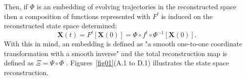 \documentclass[fleqn,10pt]{wlscirep}
\begin{document}
Then, if $\Phi$ is an embedding of evolving trajectories in the reconstructed 
space then a composition of functions represented with $F^t$ is induced on the
reconstructed state space determined:
\begin{equation}\label{eq:st}
  \boldsymbol{X}(t)=F^t [\boldsymbol{X}(0)] = \Phi \circ f^t \circ \Phi ^{-1}[\boldsymbol{X}(0)].
\end{equation}
With this in mind, an embedding is defined as "a smooth one-to-one 
coordinate transformation with a smooth inverse" and the total reconstruction 
map is defined as $ \Xi = \Psi \circ \Phi $ \cite{casdagli1991}.
Figures~\ref{fig01}(A.1 to D.1) illustrates the state space reconstruction.
\end{document}
